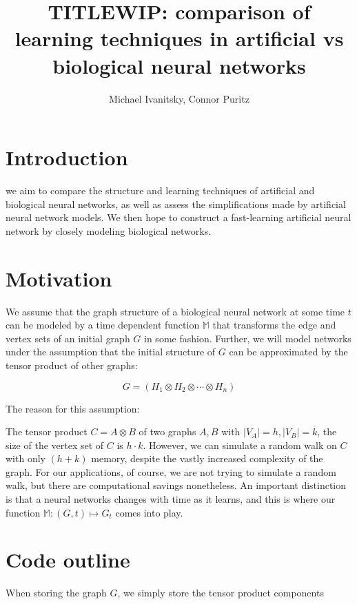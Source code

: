 \documentclass{article}
\date{}
\title{TITLE}
\author{Michael Ivanitsky, Connor Puritz}
\title{WIP: comparison of learning techniques in artificial vs biological neural networks}
\newcommand{\tensProd}{\otimes}
\newcommand{\M}{\mathbb{M}}
\begin{document}
\maketitle


\section{Introduction}

we aim to compare the structure and learning techniques of artificial and biological neural networks, as well as assess the simplifications made by artificial neural network models. We then hope to construct a fast-learning artificial neural network by closely modeling biological networks.


\section{Motivation}

We assume that the graph structure of a biological neural network at some time $t$ can be modeled by a time dependent function $\M$ that transforms the edge and vertex sets of an initial graph $G$ in some fashion. Further, we will model networks under the assumption that the initial structure of $G$ can be approximated by the tensor product of other graphs:

$$ G = (H_1 \tensProd H_2 \tensProd \cdots \tensProd H_n ) $$

The reason for this assumption:

The tensor product $ C = A \otimes B$ of two graphs $A,B$ with $|V_A| = h, |V_B| = k$, the size of the vertex set of $C$ is $h \cdot k$. However, we can simulate a random walk on $C$ with only $(h + k)$ memory, despite the vastly increased complexity of the graph. For our applications, of course, we are not trying to simulate a random walk, but there are computational savings nonetheless. An important distinction is that a neural networks changes with time as it learns, and this is where our function $\M : (G, t) \mapsto G_t$ comes into play.


\section{Code outline}

When storing the graph $G$, we simply store the tensor product components
\end{document}
